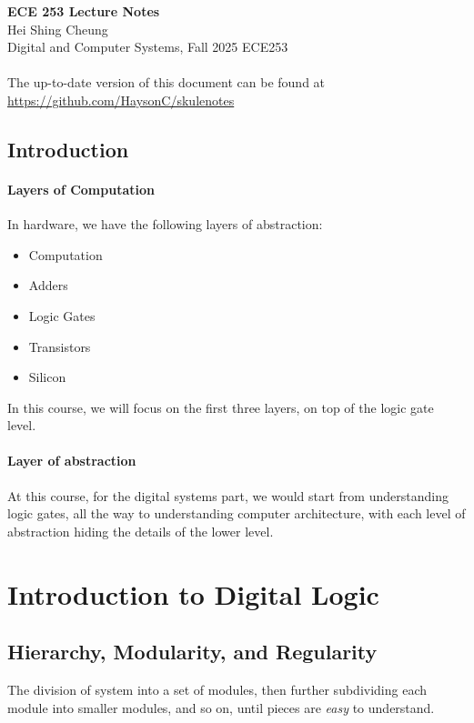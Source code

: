 \documentclass[11pt]{article}
\begin{document}
\thispagestyle{empty}
{\LARGE \bf ECE 253 Lecture Notes}\\
{\large Hei Shing Cheung}\\
Digital and Computer Systems, Fall 2025 \hfill ECE253\\
\\
The up-to-date version of this document can be found at \url{https://github.com/HaysonC/skulenotes}\\

\begin{shaded}
\section*{Introduction}
\paragraph{Layers of Computation} In hardware, we have the following layers of abstraction:
\begin{itemize}
    \item Computation
    \item Adders 
    \item Logic Gates
    \item Transistors
    \item Silicon
\end{itemize}
In this course, we will focus on the first three layers, on top of the logic gate level.


\paragraph{Layer of abstraction} At this course, for the digital systems part, we would start from understanding logic gates, all the way to understanding computer architecture, with each level of abstraction hiding the details of the lower level.
\end{shaded}

\section{Introduction to Digital Logic}

\subsection{Hierarchy, Modularity, and Regularity}

\begin{definition}[Hierarchy]
    The division of system into a set of modules, then further subdividing each module into smaller modules, and so on, until pieces are \textit{easy} to understand.    
\end{definition}
\end{document}

